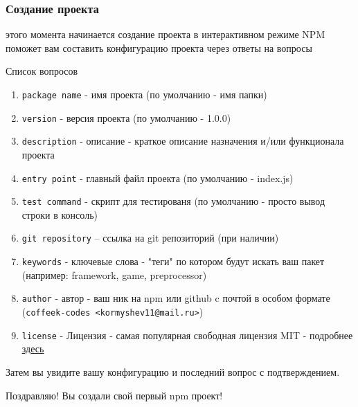 \documentclass[aspectratio=169]{beamer}
\begin{document}

\begin{frame}
  \frametitle{Создание проекта}
  \begin{center}
    
     этого момента начинается создание проекта в интерактивном режиме
    NPM поможет вам составить конфигурацию проекта через ответы на вопросы
  \end{center}
  \bigskip
  \begin{center}
    Список вопросов
  \end{center}

  \begin{enumerate}
  \item \texttt{package name} - имя проекта (по умолчанию - имя папки)
  \item \texttt{version} - версия проекта (по умолчанию - 1.0.0)
  \item \texttt{description} - описание - краткое описание назначения и/или функционала проекта
  \item \texttt{entry point} - главный файл проекта (по умолчанию - index.js)
  \item \texttt{test command} - скрипт для тестированя (по умолчанию - просто вывод строки в консоль)
  \item \texttt{git repository} -- ссылка на git репозиторий (при наличии)
  \item \texttt{keywords} - ключевые слова - "теги" по котором будут искать ваш пакет (например: framework, game, preprocessor)
  \item \texttt{author} - автор - ваш ник на npm или github c почтой в особом формате (\texttt{coffeek-codes <kormyshev11@mail.ru>})
  \item \texttt{license} - Лицензия - самая популярная свободная лицензия MIT - подробнее \underline{\href{https://wiki.merionet.ru/articles/sravnenie-open-source-licenzij/}{здесь}}
  \end{enumerate}

  \begin{center}
    Затем вы увидите вашу конфигурацию и последний вопрос с подтверждением.
  \end{center}

  \bigskip
  \bigskip
  \bigskip

  \begin{center}
    \large Поздравляю! Вы создали свой первый npm проект!
  \end{center}
  
\end{frame}
\end{document}
